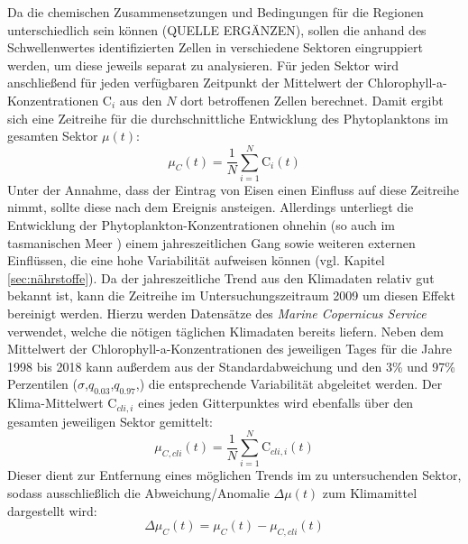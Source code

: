 \documentclass[12pt,a4paper,onecolumn]{scrartcl}
\begin{document}
Da die chemischen Zusammensetzungen und Bedingungen für die Regionen unterschiedlich sein können (QUELLE ERGÄNZEN), sollen die anhand des Schwellenwertes identifizierten Zellen in verschiedene Sektoren eingruppiert werden, um diese jeweils separat zu analysieren. Für jeden Sektor wird anschließend für jeden verfügbaren Zeitpunkt der Mittelwert der Chlorophyll-a-Konzentrationen $\text{C}_i$ aus den $N$ dort betroffenen Zellen berechnet. Damit ergibt sich eine Zeitreihe für die durchschnittliche Entwicklung des Phytoplanktons im gesamten Sektor $\mu(t)$:
\begin{equation}
\mu_C(t) = \frac{1}{N}\sum\limits_{i=1}^{N} \text{C}_i(t)
\end{equation}
Unter der Annahme, dass der Eintrag von Eisen einen Einfluss auf diese Zeitreihe nimmt, sollte diese nach dem Ereignis ansteigen. Allerdings unterliegt die Entwicklung der Phytoplankton-Konzentrationen ohnehin (so auch im tasmanischen Meer \citep{Tilburg.2002}) einem jahreszeitlichen Gang sowie weiteren externen Einflüssen, die eine hohe Variabilität aufweisen können (vgl. Kapitel \ref{sec:nährstoffe}). Da der jahreszeitliche Trend aus den Klimadaten relativ gut bekannt ist, kann die Zeitreihe im Untersuchungszeitraum 2009 um diesen Effekt bereinigt werden. Hierzu werden Datensätze des \textit{Marine Copernicus Service} verwendet, welche die nötigen täglichen Klimadaten bereits liefern. Neben dem Mittelwert der Chlorophyll-a-Konzentrationen des jeweiligen Tages für die Jahre 1998 bis 2018 kann außerdem aus der Standardabweichung und den 3\% und 97\% Perzentilen ($\sigma$,$q_{0.03}$,$q_{0.97}$,) die entsprechende Variabilität abgeleitet werden. Der Klima-Mittelwert $\text{C}_{cli,i}$ eines jeden Gitterpunktes wird ebenfalls über den gesamten jeweiligen Sektor gemittelt:
\begin{equation}
\mu_{C,cli}(t) = \frac{1}{N}\sum\limits_{i=1}^{N} \text{C}_{cli,i}(t)
\end{equation}
Dieser dient zur Entfernung eines möglichen Trends im zu untersuchenden Sektor, sodass ausschließlich die Abweichung/Anomalie $\Delta \mu(t)$ zum Klimamittel dargestellt wird:
\begin{equation}
\Delta \mu_C(t) = \mu_C(t) - \mu_{C,cli}(t) \label{eq:cli_anomalie}
\end{equation} 
\end{document}
